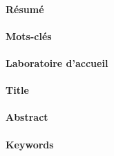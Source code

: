 {	\paragraph*{Résumé} \BXresume
	
	\paragraph*{Mots-clés} \BXmotscles
	
	\paragraph*{Laboratoire d'accueil} \BXlabo
	
	\newpage
	
	\paragraph*{Title} \BXtitle
	
	\paragraph*{Abstract} \BXabstract
	
	\paragraph*{Keywords} \BXkeywords
	
}

\newcommand{\logos}{\texttt{[image: logos.png]}}

\newcommand{\BXed}{}
\newcommand{\BXspe}{}
\newcommand{\BXnom}{}
\newcommand{\BXsujet}{}
\newcommand{\BXannee}{}
\newcommand{\BXdate}{}
\newcommand{\BXexamlist}{}
\newcommand{\BXresume}{}
\newcommand{\BXtitle}{}
\newcommand{\BXabstract}{}
\newcommand{\BXmotscles}{}
\newcommand{\BXkeywords}{}
\newcommand{\BXlabo}{}
\newcommand{\BXnomcourt}{}
\newcommand{\BXsujetcourt}{}
